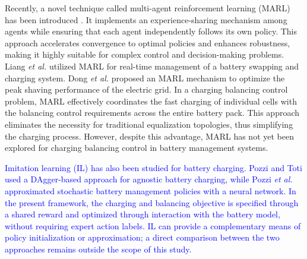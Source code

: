 \documentclass[journal]{IEEEtran}
\newcommand{\rev}[1]{\textcolor{blue}{#1}}
\begin{document}
Recently, a novel technique called multi-agent reinforcement learning (MARL) has been introduced \cite{19, 20}. It implements an experience-sharing mechanism among agents while ensuring that each agent independently follows its own policy. This approach accelerates convergence to optimal policies and enhances robustness, making it highly suitable for complex control and decision-making problems. Liang {\it et al.} \cite{21} utilized MARL for real-time management of a battery swapping and charging system. Dong {\it et al.} \cite{22} proposed an MARL mechanism to optimize the peak shaving performance of the electric grid. In a charging balancing control problem, MARL effectively coordinates the fast charging of individual cells with the balancing control requirements across the entire battery pack. This approach eliminates the necessity for traditional equalization topologies, thus simplifying the charging process. However, despite this advantage, MARL has not yet been explored for charging balancing control in battery management systems.

\rev{Imitation learning (IL) has also been studied for battery charging. Pozzi and Toti \cite{pozzi2023dagger} used a DAgger-based approach for agnostic battery charging, while Pozzi \textit{et al.} \cite{pozzi2025stochastic} approximated stochastic battery management policies with a neural network. In the present framework, the charging and balancing objective is specified through a shared reward and optimized through interaction with the battery model, without requiring expert action labels. IL can provide a complementary means of policy initialization or approximation; a direct comparison between the two approaches remains outside the scope of this study.}
\end{document}

